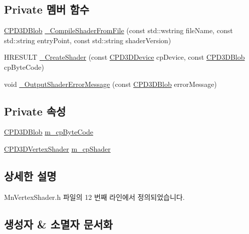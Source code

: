 \subsection*{Private 멤버 함수}
\begin{DoxyCompactItemize}
\item 
\hyperlink{namespace_m_n_l_a3716e3bee60c31fe1b7b5dd5a82db59a}{C\+P\+D3\+D\+Blob} \hyperlink{class_m_n_l_1_1_mn_vertex_shader_aa97b2e9590a449c6be9871fa856e8d95}{\+\_\+\+Compile\+Shader\+From\+File} (const std\+::wstring file\+Name, const std\+::string entry\+Point, const std\+::string shader\+Version)
\item 
H\+R\+E\+S\+U\+LT \hyperlink{class_m_n_l_1_1_mn_vertex_shader_adca7dd6c2c00001fe809bbfd93434f51}{\+\_\+\+Create\+Shader} (const \hyperlink{namespace_m_n_l_a1eec210db8f309a4a9ac0d9658784c31}{C\+P\+D3\+D\+Device} cp\+Device, const \hyperlink{namespace_m_n_l_a3716e3bee60c31fe1b7b5dd5a82db59a}{C\+P\+D3\+D\+Blob} cp\+Byte\+Code)
\item 
void \hyperlink{class_m_n_l_1_1_mn_vertex_shader_af6bb89ea7f32a4cd77792a473b988a5a}{\+\_\+\+Output\+Shader\+Error\+Message} (const \hyperlink{namespace_m_n_l_a3716e3bee60c31fe1b7b5dd5a82db59a}{C\+P\+D3\+D\+Blob} error\+Message)
\end{DoxyCompactItemize}
\subsection*{Private 속성}
\begin{DoxyCompactItemize}
\item 
\hyperlink{namespace_m_n_l_a3716e3bee60c31fe1b7b5dd5a82db59a}{C\+P\+D3\+D\+Blob} \hyperlink{class_m_n_l_1_1_mn_vertex_shader_acac8cfa86f343e2d2c016c967414af3b}{m\+\_\+cp\+Byte\+Code}
\item 
\hyperlink{namespace_m_n_l_a8036d713226061c4827b537821fbf79b}{C\+P\+D3\+D\+Vertex\+Shader} \hyperlink{class_m_n_l_1_1_mn_vertex_shader_a8033aa677c077c1a84cfaa1120a630dc}{m\+\_\+cp\+Shader}
\end{DoxyCompactItemize}


\subsection{상세한 설명}


Mn\+Vertex\+Shader.\+h 파일의 12 번째 라인에서 정의되었습니다.



\subsection{생성자 \& 소멸자 문서화}
\mbox{\label{class_m_n_l_1_1_mn_vertex_shader_a21690c1ec2d42845c4b9f1e3fa72e053}} 
